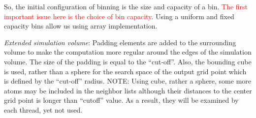 So, the initial configuration of binning is the size and capacity of a
bin. \textcolor{red}{The first important issue here is the choice of
  bin capacity}. Using a uniform and fixed capacity bins allow us
using array implementation. 


{\it Extended simulation volume}: Padding elements are added to the
surrounding volume to make the computation more regular around the
edges of the simulation volume. The size of the padding is equal to
the ``cut-off''. Also, the bounding cube is used, rather than a sphere
for the search space of the output grid point which is defined by the
``cut-off'' radius. NOTE: Using cube, rather a sphere, some more atoms
may be included in the neighbor lists although their distances to the
center grid point is longer than ``cutoff'' value. As a result, they
will be examined by each thread, yet not used.



